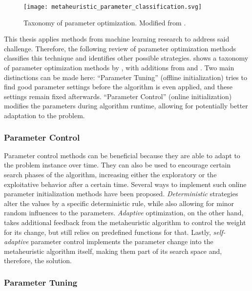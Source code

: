 \begin{figure}[h]
	\centering
	\texttt{[image: metaheuristic\_parameter\_classification.svg]}
	\caption[Taxonomy of parameter optimization]{Taxonomy of parameter optimization. Modified from \citet{eiben1999parameter}.}
	\label{fig:paramtax}
\end{figure}

This thesis applies methods from machine learning research to address said challenge. Therefore, the following review of parameter optimization methods classifies this technique and identifies other possible strategies.  shows a taxonomy of parameter optimization methods by \citet{eiben1999parameter}, with additions from \citet{talbi2009metaheuristics} and \citet{stutzle2012parameter}. Two main distinctions can be made here: \enquote{Parameter Tuning} (offline initialization) tries to find good parameter settings before the algorithm is even applied, and these settings remain fixed afterwards. \enquote{Parameter Control} (online initialization) modifies the parameters during algorithm runtime, allowing for potentially better adaptation to the problem.

\subsubsection{Parameter Control}

Parameter control methods can be beneficial because they are able to adapt to the problem instance over time. They can also be used to encourage certain search phases of the algorithm, increasing either the exploratory or the exploitative behavior after a certain time. Several ways to implement such online parameter initialization methods have been proposed. \textit{Deterministic} strategies alter the values by a specific deterministic rule, while also allowing for minor random influences to the parameters. \textit{Adaptive} optimization, on the other hand, takes additional feedback from the metaheuristic algorithm to control the weight for its change, but still relies on predefined functions for that. Lastly, \textit{self-adaptive} parameter control implements the parameter change into the metaheuristic algorithm itself, making them part of its search space and, therefore, the solution.

\subsubsection{Parameter Tuning}
\label{chap:tuning}

